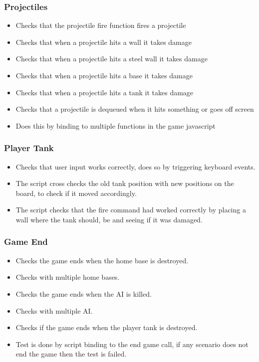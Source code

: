 \documentclass{article}
\begin{document}
\subsubsection{Projectiles}
\begin{itemize}  
\item Checks that the projectile fire function fires a projectile
\item Checks that when a projectile hits a wall it takes damage
\item Checks that when a projectile hits a steel wall it takes damage
\item Checks that when a projectile hits a base it takes damage
\item Checks that when a projectile hits a tank it takes damage
\item Checks that a projectile is dequeued when it hits something
	or goes off screen
\item Does this by binding to multiple functions in the game javascript
\end{itemize}

\subsubsection{Player Tank}
\begin{itemize}  
\item Checks that user input works correctly, does so by triggering 
	keyboard events.
\item The script cross checks the old tank position with new positions 
	on the board, to check if it moved accordingly.
\item The script checks that the fire command had worked correctly by 
	placing a wall where the tank should, be and seeing if it was 
	damaged.
\end{itemize}

\subsubsection{Game End}
\begin{itemize}  
\item Checks the game ends when the home base is destroyed.
\item  Checks with multiple home bases.
\item Checks the game ends when the AI is killed.
\item  Checks with multiple AI.
\item Checks if the game ends when the player tank is destroyed.
\item Test is done by script binding to the end game call, if any scenario
	does not end the game then the test is failed.
\end{itemize}
\end{document}
